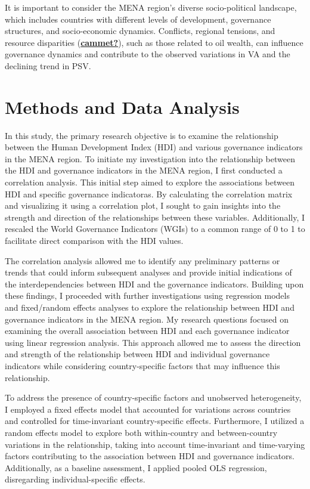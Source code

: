 \documentclass[
  12pt,
]{article}
\begin{document}
It is important to consider the MENA region's diverse socio-political landscape, which includes countries with different levels of development, governance structures, and socio-economic dynamics. Conflicts, regional tensions, and resource disparities (\protect\hyperlink{ref-cammet}{\textbf{cammet?}}), such as those related to oil wealth, can influence governance dynamics and contribute to the observed variations in VA and the declining trend in PSV.

\hypertarget{methods-and-data-analysis}{%
\section{Methods and Data Analysis}\label{methods-and-data-analysis}}

In this study, the primary research objective is to examine the relationship between the Human Development Index (HDI) and various governance indicators in the MENA region. To initiate my investigation into the relationship between the HDI and governance indicators in the MENA region, I first conducted a correlation analysis. This initial step aimed to explore the associations between HDI and specific governance indicatoras. By calculating the correlation matrix and visualizing it using a correlation plot, I sought to gain insights into the strength and direction of the relationships between these variables. Additionally, I rescaled the World Governance Indicators (WGIs) to a common range of 0 to 1 to facilitate direct comparison with the HDI values.

The correlation analysis allowed me to identify any preliminary patterns or trends that could inform subsequent analyses and provide initial indications of the interdependencies between HDI and the governance indicators. Building upon these findings, I proceeded with further investigations using regression models and fixed/random effects analyses to explore the relationship between HDI and governance indicators in the MENA region. My research questions focused on examining the overall association between HDI and each governance indicator using linear regression analysis. This approach allowed me to assess the direction and strength of the relationship between HDI and individual governance indicators while considering country-specific factors that may influence this relationship.

To address the presence of country-specific factors and unobserved heterogeneity, I employed a fixed effects model that accounted for variations across countries and controlled for time-invariant country-specific effects. Furthermore, I utilized a random effects model to explore both within-country and between-country variations in the relationship, taking into account time-invariant and time-varying factors contributing to the association between HDI and governance indicators. Additionally, as a baseline assessment, I applied pooled OLS regression, disregarding individual-specific effects.
\end{document}
